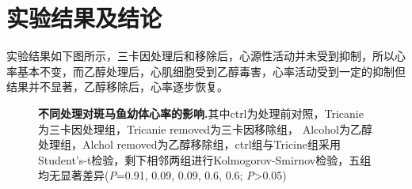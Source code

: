 \documentclass[UTF-8]{ctexart}
\begin{document}
    \section{实验结果及结论}
    实验结果如下图所示，三卡因处理后和移除后，心源性活动并未受到抑制，所以心率基本不变，而乙醇处理后，心肌细胞受到乙醇毒害，心率活动受到一定的抑制但结果并不显著，乙醇移除后，心率逐步恢复。
    \begin{figure}[h]
        \centering
        \caption[]{\textbf{不同处理对斑马鱼幼体心率的影响.}其中ctrl为处理前对照，Tricanie为三卡因处理组，Tricanie removed为三卡因移除组，
        Alcohol为乙醇处理组，Alchol removed为乙醇移除组，ctrl组与Tricine组采用Student's-t检验，剩下相邻两组进行Kolmogorov-Smirnov检验，五组均无显著差异(\textit{P}=0.91, 0.09, 0.09, 0.6, 0.6; \textit{P}>0.05)}
    \end{figure}
\end{document}
